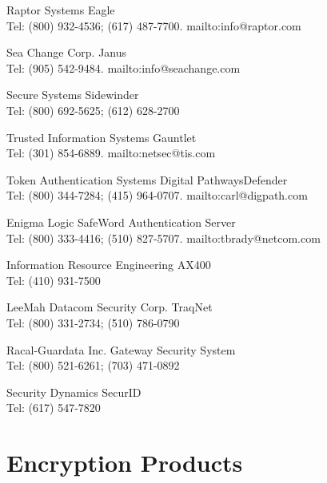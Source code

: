 \begin{htmllist}
  \item[Raptor Systems]
    Eagle\\
    Tel: (800) 932-4536; (617) 487-7700.
    {mailto:info@raptor.com}

  \item[Sea Change Corp.]
    Janus\\
    Tel: (905) 542-9484.
    {mailto:info@seachange.com}

  \item[Secure Systems]
    Sidewinder\\
    Tel: (800) 692-5625; (612) 628-2700

  \item[Trusted Information Systems]
    Gauntlet\\
    Tel: (301) 854-6889.
    {mailto:netsec@tis.com}

  \item[Token Authentication Systems]
    Digital PathwaysDefender\\
    Tel: (800) 344-7284; (415) 964-0707.
    {mailto:carl@digpath.com}

  \item[Enigma Logic]
    SafeWord Authentication Server\\
    Tel: (800) 333-4416; (510) 827-5707.
    {mailto:tbrady@netcom.com}

  \item[Information Resource Engineering]
    AX400\\
    Tel: (410) 931-7500

  \item[LeeMah Datacom Security Corp.]
    TraqNet\\
    Tel: (800) 331-2734; (510) 786-0790

  \item[Racal-Guardata Inc.]
    Gateway Security System\\
    Tel: (800) 521-6261; (703) 471-0892

  \item[Security Dynamics]
    SecurID\\
    Tel: (617) 547-7820
\end{htmllist}

\section{Encryption Products}


